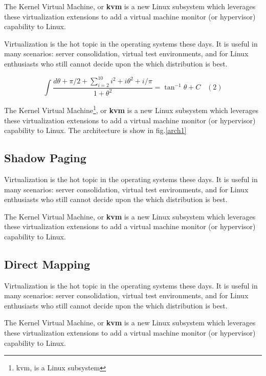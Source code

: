 \documentclass[a4paper,twocolumn,10pt]{article}
\begin{document}
  
  \noindent The Kernel Virtual Machine, or \textbf{kvm} is a new Linux
  subsystem which leverages these virtualization extensions
  to add a virtual machine monitor (or hypervisor) capability to Linux.
 
  \noindent Virtualization is the  hot topic in the operating systems 
  these days. It is useful in many scenarios: server consolidation,
  virtual test environments, and for Linux enthusiasts who
  still cannot decide upon the which distribution is best.
  
 \begin{displaymath}\int\frac{d\theta + \pi/2 + \sum \limits_{i=2}^{10} i^2 + i\theta ^2 + i/\pi }{1+\theta^2}=\tan^{-1} \theta + C \hspace{10pt}(2)
  \end{displaymath}

 

  
  \noindent The Kernel Virtual Machine\footnote{kvm, is a Linux subsystem}, or \textbf{kvm} is a new Linux
  subsystem which leverages these virtualization extensions
  to add a virtual machine monitor (or hypervisor) capability to Linux. The architecture is show in fig.\ref{arch1}

   \subsection{Shadow Paging}
    \noindent Virtualization is \newline the hot topic in the operating systems 
  these days. It is useful in many scenarios: server consolidation,
  virtual test environments, and for Linux enthusiasts who
  still cannot decide upon the which distribution is best.
  
  \noindent The Kernel Virtual Machine, or \textbf{kvm} is a new Linux
  subsystem which leverages these virtualization extensions
  to add a virtual machine monitor (or hypervisor) capability to Linux.
   
   \subsection{Direct Mapping}
   
    \noindent Virtualization is the hot topic in the operating systems 
  these days. It is useful in many scenarios: server consolidation,
  virtual test environments, and for Linux enthusiasts who
  still cannot decide upon the which distribution\cite{Sh:11} is best.
    
  \noindent The Kernel Virtual Machine, or \textbf{kvm} is a new Linux
  subsystem which leverages these virtualization extensions
  to add a virtual machine monitor (or hypervisor) capability to Linux.
   
\end{document}
